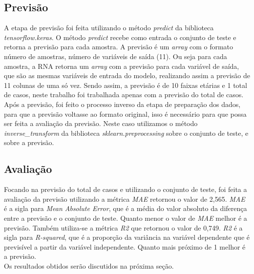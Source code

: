 \documentclass[
	article,			%
	12pt,				%
	a4paper,			%
	chapter=TITLE,		%
	section=TITLE,		%
	subsection=TITLE,	%
	subsubsection=TITLE %
	english,			%
	brazil,				%
	sumario=tradicional
	]{abntex2}
\begin{document}
\subsection{Previsão}
A etapa de previsão foi feita utilizando o método \textit{predict} da biblioteca \textit{tensorflow.keras}. O método \textit{predict} recebe como entrada o conjunto de teste e retorna a previsão para cada amostra. A previsão é um \textit{array} com o formato número de amostras, número de variáveis de saída (11). Ou seja para cada amostra, a RNA retorna um \textit{array} com a previsão para cada variável de saída, que são as mesmas variáveis de entrada do modelo, realizando assim a previsão de 11 colunas de uma só vez. Sendo assim, a previsão é de 10 faixas etárias e 1 total de casos, neste trabalho foi trabalhada apenas com a previsão do total de casos. Após a previsão, foi feito o processo inverso da etapa de preparação dos dados, para que a previsão voltasse ao formato original, isso é necessário para que possa ser feita a avaliação da previsão. Neste caso utilizamos o método \textit{inverse\_transform} da biblioteca \textit{sklearn.preprocessing} sobre o conjunto de teste, e sobre a previsão. 
\subsection{Avaliação}
Focando na previsão do total de casos e utilizando o conjunto de teste, foi feita a avaliação da previsão utilizando a métrica \textit{MAE} retornou o valor de 2,565. \textit{MAE} é a sigla para \textit{Mean Absolute Error}, que é a média do valor absoluto da diferença entre a previsão e o conjunto de teste. Quanto menor o valor de \textit{MAE} melhor é a previsão.
Também utiliza-se a métrica \textit{R2} que retornou o valor de 0,749. \textit{R2} é a sigla para \textit{R-squared}, que é a proporção da variância na variável dependente que é previsível a partir da variável independente. Quanto mais próximo de 1 melhor é a previsão.
\\ \indent
Os resultados obtidos serão discutidos na próxima seção.
\end{document}
